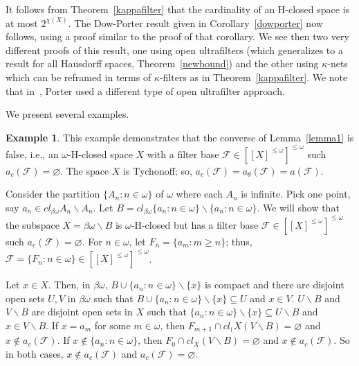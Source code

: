 \documentclass[11pt]{amsart}
\theoremstyle{definition}
\newtheorem{example}[theorem]{Example}
\theoremstyle{remark}
\numberwithin{equation}{section}
\begin{document}
It follows from Theorem~\ref{kappafilter} that the cardinality of an H-closed space is at most $2^{\chi(X)}$. The Dow-Porter result given in Corollary~\ref{dowporter} now follows, using a proof similar to the proof of that corollary. We see then two very different proofs of this result, one using open ultrafilters (which generalizes to a result for all Hausdorff spaces, Theorem~\ref{newbound}) and the other using $\kappa$-nets~\cite{Hodel2006} which can be reframed in terms of $\kappa$-filters as in Theorem~\ref{kappafilter}. We note that in~\cite{por93}, Porter used a different type of open ultrafilter approach.

We present several examples. 

\begin{example} 
This example demonstrates that the converse of Lemma~\ref{lemma1} is false, i.e.,  an $\omega$-H-closed space $X$ with a filter base ${{\ensuremath{\mathcal{F}}}} \in [[X]^{\leq \omega}]^{\leq \omega}$  such $a_{c}({{\ensuremath{\mathcal{F}}}}) = \varnothing$.  The space $X$ is Tychonoff; so, $a_{c}({{\ensuremath{\mathcal{F}}}}) = a_{\theta}({{\ensuremath{\mathcal{F}}}}) = a({{\ensuremath{\mathcal{F}}}})$.

Consider the partition $\{A_n:n \in \omega\}$  of  $\omega$  where each $A_n$ is infinite. Pick one point, say $a_n \in cl_{\beta\omega}A_n\backslash A_n$.  Let $B = cl_{\beta\omega}\{a_n:n \in \omega\}\backslash \{a_n:n \in \omega\}$.  
We will show that the subspace $X = \beta\omega\backslash B$ is $\omega$-H-closed but has a filter base ${{\ensuremath{\mathcal{F}}}} \in [[X]^{\leq \omega}]^{\leq \omega}$  such $a_{c}({{\ensuremath{\mathcal{F}}}}) = \varnothing$.
For $n \in \omega$, let $F_n = \{a_m: m \geq n\}$; thus, ${{\ensuremath{\mathcal{F}}}} = \{F_n: n \in \omega\} \in [[X]^{\leq \omega}]^{\leq \omega}$.

Let $x \in X$. Then, in $\beta\omega$, $B \cup \{a_n:n \in \omega\}\backslash \{x\}$ is compact and there are disjoint open sets $U,V$ in $\beta\omega$ such that $B \cup \{a_n:n \in \omega\}\backslash \{x\} \subseteq U$ and $x \in V$.  $U\backslash B $ and $V\backslash B$ are disjoint open sets in $X$ such that $ \{a_n:n \in \omega\}\backslash \{x\} \subseteq U\backslash B$ and $x \in V\backslash B$.
If $x = a_m$ for some $m \in \omega$, then $F_{m+1}\cap cl_(X(V\backslash B) = \varnothing$ and $x \not\in a_{c}({{\ensuremath{\mathcal{F}}}})$.
If $x \not\in  \{a_n:n \in \omega\}$, then $F_0 \cap cl_X(V\backslash B)= \varnothing$ and $x \not\in a_{c}({{\ensuremath{\mathcal{F}}}})$.
So in both cases, $x \not\in a_{c}({{\ensuremath{\mathcal{F}}}})$ and $a_{c}({{\ensuremath{\mathcal{F}}}}) = \varnothing.$ 


\end{example}
\end{document}
